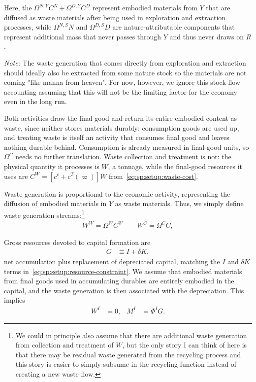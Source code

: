 Here, the $\Omega^{N,Y}C^N+\Omega^{D,Y}C^D$ represent embodied materials from $Y$ that are diffused as waste materials after being used in exploration and extraction processes, while $\Omega^{N,S} N $ and $\Omega^{D,S} D$ are nature-attributable components that represent additional mass that never passes through $Y$ and thus never draws on $R$. 

\textit{Note:} The waste generation that comes directly from exploration and extraction should ideally also be extracted from some nature stock so the materials are not coming "like manna from heaven". For now, however, we ignore this stock-flow accounting assuming that this will not be the limiting factor for the economy even in the long run.




 Both activities draw the final good and return its entire embodied content as waste, since neither stores materials durably: consumption goods are used up, and treating waste is itself an activity that consumes final good and leaves nothing durable behind. Consumption is already measured in final-good units, so $\Omega^C$ needs no further translation. Waste collection and treatment is not: the physical quantity it processes is $W$, a tonnage, while the final-good resources it uses are $C^W=\left[c^c+c^T(\varpi)\right]W$ from~\eqref{eq:sp:setup:waste-cost}. 


Waste generation is proportional to the economic activity, representing the diffusion of embodied materials in $Y$ as waste materials. Thus, we simply define waste generation streams:\footnote{We could in principle also assume that there are additional waste generation from collection and treatment of $W$, but the only story I can think of here is that there may be residual waste generated from the recycling process and this story is easier to simply subsume in the recycling function instead of creating a new waste flow.}
\begin{align}
    W^W = \Omega^{W} C^W \qquad W^C= \Omega^C C, \label{eq:sp:setup:wc}
\end{align}


 Gross resources devoted to capital formation are
\begin{align}
G &\equiv I+\delta K,
\label{eq:sp:setup:gross-formation}
\end{align}
net accumulation plus replacement of depreciated capital, matching the $I$ and $\delta K$ terms in~\eqref{eq:sp:setup:resource-constraint}. We assume that embodied materials from final goods used in accumulating durables are entirely embodied in the capital, and the waste generation is then associated with the depreciation. This implies
\begin{align}
    W^I &= 0, & M^I &= \Phi^IG.
\label{eq:sp:setup:investment}
\end{align}



